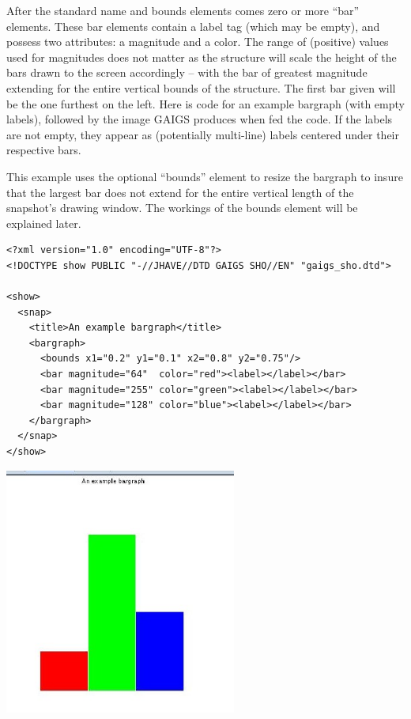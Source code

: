 \documentclass[11pt,letterpaper]{book}
\begin{document}
After the standard name and bounds elements comes zero or more ``bar''
elements. These bar elements contain a label tag (which may be empty),
and possess two attributes: a magnitude and a color. The range of
(positive) values used for magnitudes does not matter as the structure
will scale the height of the bars drawn to the screen accordingly --
with the bar of greatest magnitude extending for the entire vertical
bounds of the structure. The first bar given will be the one furthest
on the left. Here is code for an example bargraph (with empty labels),
followed by the image GAIGS produces when fed the code.  If the labels
are not empty, they appear as (potentially multi-line) labels centered
under their respective bars.

This example uses the optional ``bounds'' element to resize the
bargraph to insure that the largest bar does not extend for the entire
vertical length of the snapshot's drawing window. The workings of the
bounds element will be explained later.

\footnotesize \begin{verbatim}
<?xml version="1.0" encoding="UTF-8"?>
<!DOCTYPE show PUBLIC "-//JHAVE//DTD GAIGS SHO//EN" "gaigs_sho.dtd">

<show>
  <snap>
    <title>An example bargraph</title>
    <bargraph>
      <bounds x1="0.2" y1="0.1" x2="0.8" y2="0.75"/>
      <bar magnitude="64"  color="red"><label></label></bar>
      <bar magnitude="255" color="green"><label></label></bar>
      <bar magnitude="128" color="blue"><label></label></bar>
    </bargraph>
  </snap>
</show>
\end{verbatim} \normalsize


\begin{center}
  \includegraphics[width=3in]{howto_graphics/bargraph.eps}
\end{center}
\end{document}
